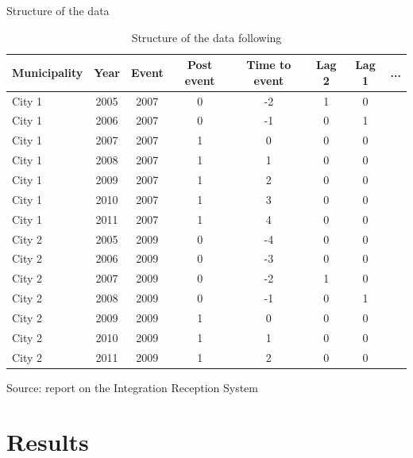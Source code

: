 \documentclass[xcolor={dvipsnames}]{beamer}
\begin{document}
\begin{frame}{Structure of the data}
\fontsize{6}{7.2}\selectfont \\
\vspace{-10}
\begin{table}[h]
    \centering
        \caption{Structure of the data following \cite{clarke2020}}
    \begin{tabular}{l*{7}c}
    \hline
Municipality & Year & Event & Post event & Time to event & Lag 2 & Lag 1 & ... \\
\hline \hline
City 1 & 2005 & 2007 & 0 & -2 & 1 & 0 \\
City 1 & 2006 & 2007 & 0 & -1 & 0 & 1 \\
City 1 & 2007 & 2007 & 1 & 0 & 0 & 0 \\
City 1 & 2008 & 2007 & 1 & 1 & 0 & 0 \\
City 1 & 2009 & 2007 & 1 & 2 & 0 & 0 \\
City 1 & 2010 & 2007 & 1 & 3 & 0 & 0 \\
City 1 & 2011 & 2007 & 1 & 4 & 0 & 0 \\
\hline
City 2 & 2005 & 2009 & 0 & -4 & 0 & 0 \\
City 2 & 2006 & 2009 & 0 & -3 & 0 & 0 \\
City 2 & 2007 & 2009 & 0 & -2 & 1 & 0 \\
City 2 & 2008 & 2009 & 0 & -1 & 0 & 1 \\
City 2 & 2009 & 2009 & 1 & 0 & 0 & 0 \\
City 2 & 2010 & 2009 & 1 & 1 & 0 & 0 \\
City 2 & 2011 & 2009 & 1 & 2 & 0 & 0 \\
\hline \hline
\end{tabular}
\end{table}

\fontsize{6}{7.2}\selectfont
Source: report on the Integration Reception System \citep{cittalia2022}
    
\end{frame}



\section{Results}
\end{document}
